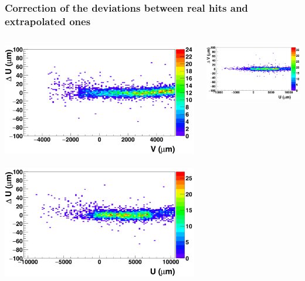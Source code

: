 \documentclass{beamer}
\begin{document}

  \begin{frame}
    \frametitle{Correction of the deviations between real hits and extrapolated ones}
  
    \vspace{-0.35cm}
    \begin{center}
      \begin{columns}[t]
        \begin{column}{4cm}
          \centering
          \includegraphics[width = 1.2\textwidth]{Pictures/deltaUV_8_corrected1.png}
          \
          \includegraphics[width = 1.2\textwidth]{Pictures/deltaUU_8_corrected1.png}
        \end{column}
        \begin{column}{4cm}
          \centering
          \includegraphics[width = 1.2\textwidth]{Pictures/deltaVU_8_corrected1.png}

\end{column}
\end{columns}
\end{center}
\end{frame}
\end{document}
